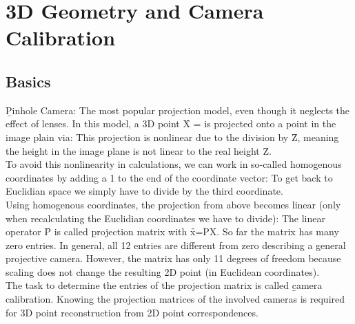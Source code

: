 \section{3D Geometry and Camera Calibration}
\subsection{Basics}
\b{Pinhole Camera:} The most popular projection model, even though it neglects the effect of lenses. In this model, a 3D point \f{X = } is projected onto a point in the image plain via:
This projection is nonlinear due to the division by \f{Z}, meaning the height in the image plane is not linear to the real height \f{Z}.\\
To avoid this nonlinearity in calculations, we can work in so-called homogenous coordinates by adding a 1 to the end of the coordinate vector:
To get back to Euclidian space we simply have to divide by the third coordinate.\\

Using homogenous coordinates, the projection from above becomes linear (only when recalculating the Euclidian coordinates we have to divide):
The linear operator \f{P} is called \b{projection matrix} with \f{x=PX}. So far the matrix has many zero entries. In general, all 12 entries are different from zero describing a general projective camera. However, the matrix has only 11 degrees of freedom because scaling does not change the resulting 2D point (in Euclidean coordinates).\\
The task to determine the entries of the projection matrix is called \b{camera calibration}. Knowing the projection matrices of the involved cameras is required for 3D point reconstruction from 2D point correspondences. \\

